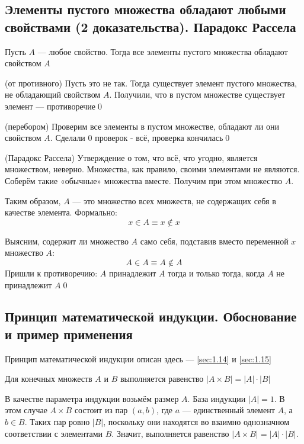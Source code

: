 \documentclass[a4paper]{article}
\begin{document}
\subsection{Элементы пустого множества обладают любыми свойствами (2 доказательства). Парадокс Рассела}
\theorem  Пусть $A$ — любое свойство. Тогда все элементы пустого множества обладают свойством $A$

\proof (от противного) Пусть это не так. Тогда существует элемент пустого множества, не обладающий свойством $A$. Получили, что в пустом множестве существует элемент — противоречие\qed 

\proof (перебором) Проверим все элементы в пустом множестве, обладают ли они свойством $A$. Сделали 0 проверок - всё, проверка кончилась\qed 

\theorem (Парадокс Рассела) Утверждение о том, что всё, что угодно, является множеством, неверно. Множества, как правило, своими элементами не являются. Соберём такие «обычные» множества вместе. Получим при этом множество $A$. 

Таким образом, $A$ — это множество всех множеств, не содержащих себя в качестве элемента. Формально:
\begin{equation*}
    x \in A \equiv x \notin x
\end{equation*}

Выясним, содержит ли множество $A$ само себя, подставив вместо переменной $x$ множество $A$:
\begin{equation*}
    A \in A \equiv A \notin A
\end{equation*}
Пришли к противоречию: $A$ принадлежит $A$ тогда и только тогда, когда $A$ не принадлежит $A$\qed

\subsection{Принцип математической индукции. Обоснование и пример применения}
Принцип математической индукции описан здесь — \ref{sec:1.14} и \ref{sec:1.15}

\ex Для конечных множеств $A$ и $B$ выполняется равенство $|A\times B|=|A|\cdot|B|$

\label{sec:2.4}\proof  В качестве параметра индукции возьмём размер $A$. База индукции $|A|=1$. В этом случае $A \times B$ состоит из пар $(a, b)$, где $a$ — единственный элемент $A$, а $b \in B$. Таких пар ровно $|B|$, поскольку они находятся во взаимно однозначном соответствии с элементами $B$. Значит, выполняется равенство $|A \times B|=|A| \cdot|B|$.
\end{document}
